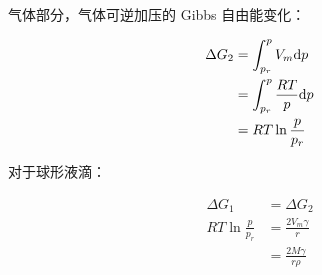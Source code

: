 气体部分，气体可逆加压的 Gibbs 自由能变化：

\begin{align}
    \Delta G_2 & = \int_{p_r}^p V_m \mathrm{d} p          \\
               & = \int_{p_r}^p \frac{RT}{p} \mathrm{d} p \\
               & = RT \ln \frac{p}{p_r}
\end{align}

对于球形液滴：

\begin{align}
    \Delta G_1           & = \Delta G_2              \\
    RT \ln \frac{p}{p_r} & = \frac{2V_m \gamma}{r}   \\
                         & = \frac{2M\gamma}{r \rho}
\end{align}
